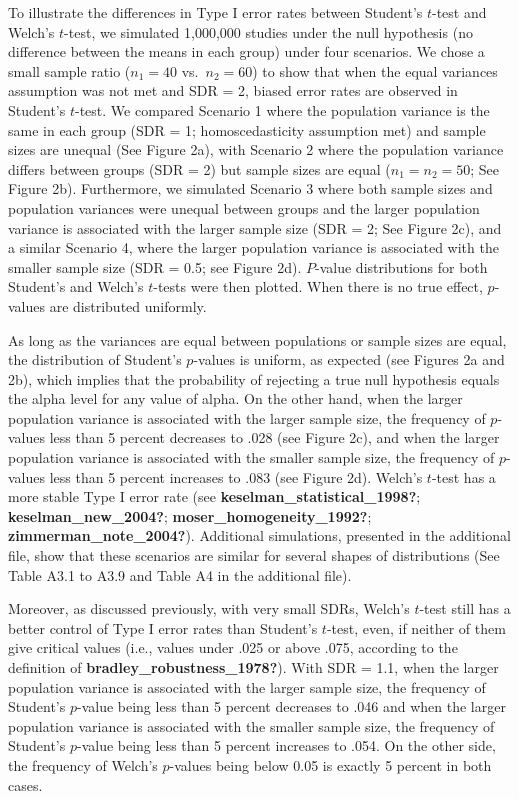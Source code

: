 \documentclass[
  english,
  man]{apa6}
\begin{document}
To illustrate the differences in Type I error rates between Student's \(t\)-test and Welch's \(t\)-test, we simulated 1,000,000 studies under the null hypothesis (no difference between the means in each group) under four scenarios. We chose a small sample ratio (\(n_1 = 40\) vs.~\(n_2 = 60\)) to show that when the equal variances assumption was not met and SDR = 2, biased error rates are observed in Student's \(t\)-test. We compared Scenario 1 where the population variance is the same in each group (SDR = 1; homoscedasticity assumption met) and sample sizes are unequal (See Figure 2a), with Scenario 2 where the population variance differs between groups (SDR = 2) but sample sizes are equal (\(n_1 = n_2 = 50\); See Figure 2b). Furthermore, we simulated Scenario 3 where both sample sizes and population variances were unequal between groups and the larger population variance is associated with the larger sample size (SDR = 2; See Figure 2c), and a similar Scenario 4, where the larger population variance is associated with the smaller sample size (SDR = 0.5; see Figure 2d). \(P\)-value distributions for both Student's and Welch's \(t\)-tests were then plotted. When there is no true effect, \(p\)-values are distributed uniformly.

As long as the variances are equal between populations or sample sizes are equal, the distribution of Student's \(p\)-values is uniform, as expected (see Figures 2a and 2b), which implies that the probability of rejecting a true null hypothesis equals the alpha level for any value of alpha. On the other hand, when the larger population variance is associated with the larger sample size, the frequency of \(p\)-values less than 5 percent decreases to .028 (see Figure 2c), and when the larger population variance is associated with the smaller sample size, the frequency of \(p\)-values less than 5 percent increases to .083 (see Figure 2d). Welch's \(t\)-test has a more stable Type I error rate (see \textbf{keselman\_statistical\_1998?}; \textbf{keselman\_new\_2004?}; \textbf{moser\_homogeneity\_1992?}; \textbf{zimmerman\_note\_2004?}). Additional simulations, presented in the additional file, show that these scenarios are similar for several shapes of distributions (See Table A3.1 to A3.9 and Table A4 in the additional file).

Moreover, as discussed previously, with very small SDRs, Welch's \(t\)-test still has a better control of Type I error rates than Student's \(t\)-test, even, if neither of them give critical values (i.e., values under .025 or above .075, according to the definition of \textbf{bradley\_robustness\_1978?}). With SDR = 1.1, when the larger population variance is associated with the larger sample size, the frequency of Student's \(p\)-value being less than 5 percent decreases to .046 and when the larger population variance is associated with the smaller sample size, the frequency of Student's \(p\)-value being less than 5 percent increases to .054. On the other side, the frequency of Welch's \(p\)-values being below 0.05 is exactly 5 percent in both cases.
\end{document}
